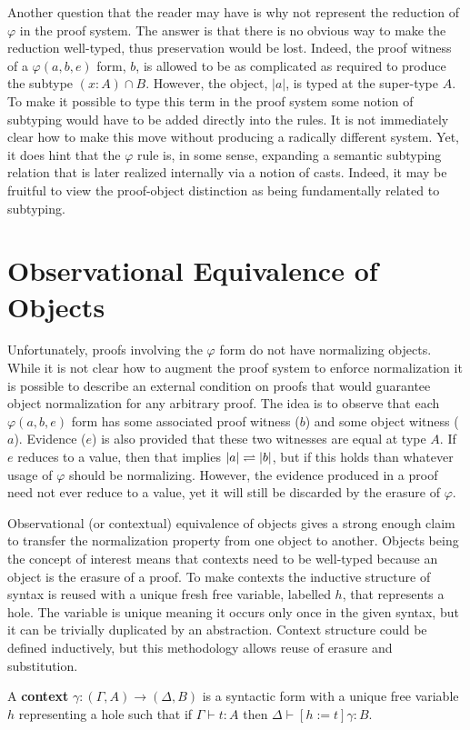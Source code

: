 Another question that the reader may have is why not represent the reduction of $\varphi$ in the proof system.
The answer is that there is no obvious way to make the reduction well-typed, thus preservation would be lost.
Indeed, the proof witness of a $\varphi(a, b, e)$ form, $b$, is allowed to be as complicated as required to produce the subtype $(x : A) \cap B$.
However, the object, $|a|$, is typed at the super-type $A$.
To make it possible to type this term in the proof system some notion of subtyping would have to be added directly into the rules.
It is not immediately clear how to make this move without producing a radically different system.
Yet, it does hint that the $\varphi$ rule is, in some sense, expanding a semantic subtyping relation that is later realized internally via a notion of casts.
Indeed, it may be fruitful to view the proof-object distinction as being fundamentally related to subtyping.

\section{Observational Equivalence of Objects}

Unfortunately, proofs involving the $\varphi$ form do not have normalizing objects.
While it is not clear how to augment the proof system to enforce normalization it is possible to describe an external condition on proofs that would guarantee object normalization for any arbitrary proof.
The idea is to observe that each $\varphi(a, b, e)$ form has some associated proof witness ($b$) and some object witness ($a$).
Evidence ($e$) is also provided that these two witnesses are equal at type $A$.
If $e$ reduces to a value, then that implies $|a| \rightleftharpoons |b|$, but if this holds than whatever usage of $\varphi$ should be normalizing.
However, the evidence produced in a proof need not ever reduce to a value, yet it will still be discarded by the erasure of $\varphi$.

Observational (or contextual) equivalence of objects gives a strong enough claim to transfer the normalization property from one object to another.
Objects being the concept of interest means that contexts need to be well-typed because an object is the erasure of a proof.
To make contexts the inductive structure of syntax is reused with a unique fresh free variable, labelled $h$, that represents a hole.
The variable is unique meaning it occurs only once in the given syntax, but it can be trivially duplicated by an abstraction.
Context structure could be defined inductively, but this methodology allows reuse of erasure and substitution.
\begin{definition}
    A \textbf{context} $\gamma : (\Gamma, A) \to (\Delta, B)$ is a syntactic form with a unique free variable $h$ representing a hole such that if $\Gamma \vdash t : A$ then $\Delta \vdash [h := t]\gamma : B$.
\end{definition}

